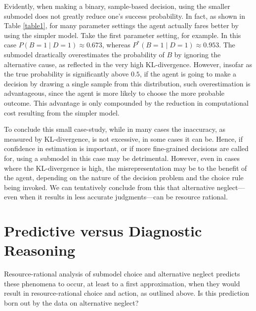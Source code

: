 \documentclass[10pt,letterpaper]{article}
\begin{document}
Evidently, when making a binary, sample-based decision, using the smaller submodel does not greatly reduce one's success probability. In fact, as shown in Table \ref{table1}, for many parameter settings the agent actually fares better by using the simpler model. Take the first parameter setting, for example. In this case $P(B=1\mid D=1) \approx 0.673$, whereas $P^*(B=1 \mid D=1) \approx 0.953$. The submodel drastically overestimates the probability of $B$ by ignoring the alternative cause, as reflected in the very high KL-divergence. However, insofar as the true probability is significantly above $0.5$, if the agent is going to make a decision by drawing a single sample from this distribution, such overestimation is advantageous, since the agent is more likely to choose the more probable outcome. This advantage is only compounded by the reduction in computational cost resulting from the simpler model.

To conclude this small case-study, while in many cases the inaccuracy, as measured by KL-divergence, is not excessive, in some cases it can be. Hence, if confidence in estimation is important, or if more fine-grained decisions are called for, using a submodel in this case may be detrimental. However, even in cases where the KL-divergence is high, the misrepresentation may be to the benefit of the agent, depending on the nature of the decision problem and the choice rule being invoked. We can tentatively conclude from this that alternative neglect---even when it results in less accurate judgments---can be resource rational. 

\section{Predictive versus Diagnostic Reasoning}

Resource-rational analysis of submodel choice and alternative neglect predicts these phenomena to occur, at least to a first approximation, when they would result in resource-rational choice and action, as outlined above. Is this prediction born out by the data on alternative neglect?
\end{document}
